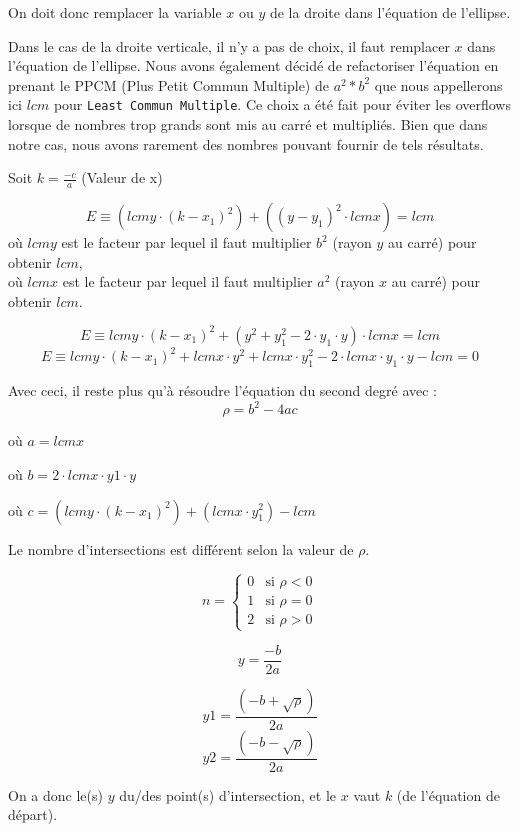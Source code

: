 \documentclass[]{report}
\begin{document}
On doit donc remplacer la variable $x$ ou $y$ de la droite dans
l'équation de l'ellipse.

Dans le cas de la droite verticale, il n'y a pas de choix, il faut remplacer
$x$ dans l'équation de l'ellipse.
Nous avons également décidé de refactoriser l'équation en 
prenant le PPCM (Plus Petit Commun Multiple) de $a^2 * b^2$ que
nous appellerons ici $lcm$ pour \texttt{Least Commun Multiple}. 
Ce choix a été fait pour éviter les overflows lorsque 
de nombres trop grands sont mis au carré et multipliés.
Bien que dans notre cas, nous avons rarement des nombres
pouvant fournir de tels résultats.

Soit $k = \frac{-c}{a} $ (Valeur de x)

$$ E \equiv (lcmy \cdot (k - x_1)^2) + ((y - y_1)^2 \cdot lcmx) = lcm $$  
où $lcmy$ est le facteur par lequel il faut multiplier
$b^2$ (rayon $y$ au carré) pour obtenir $lcm$, \\
où $lcmx$ est le facteur par lequel il faut multiplier
$a^2$ (rayon $x$ au carré) pour obtenir $lcm$.

$$ E \equiv lcmy \cdot (k - x_1)^2 + (y^2 + y_1^2 - 2 \cdot y_1 \cdot y)
\cdot lcmx = lcm$$
$$ E \equiv lcmy \cdot (k - x_1)^2 + lcmx \cdot y^2 + lcmx \cdot
y_1^2 - 2 \cdot lcmx \cdot y_1 \cdot y - lcm = 0 $$

Avec ceci, il reste plus qu'à résoudre l'équation du second degré 
avec : $$ \rho = b^2 - 4ac$$

\begin{description}
\item où $ a = lcmx $ 
\item où $ b = 2 \cdot lcmx \cdot y1 \cdot y $
\item où $ c = (lcmy \cdot (k-x_1)^2) + (lcmx \cdot y_1^2) - lcm $
\end{description}

Le nombre d'intersections est différent selon la valeur de $\rho$.

\[
	n =
	\begin{cases}
		0 & \text{si } \rho < 0 \\
		1 & \text{si } \rho = 0 \\
		2 & \text{si } \rho > 0  
	\end{cases}
\]

$$ y = \frac {-b}{2a} $$

$$ y1 = \frac{(-b + \sqrt{\rho})}{2a} $$
$$ y2 = \frac{(-b - \sqrt{\rho})}{2a} $$

On a donc le(s) $y$ du/des point(s) d'intersection, et le $x$
vaut $k$ (de l'équation de départ).
\end{document}
